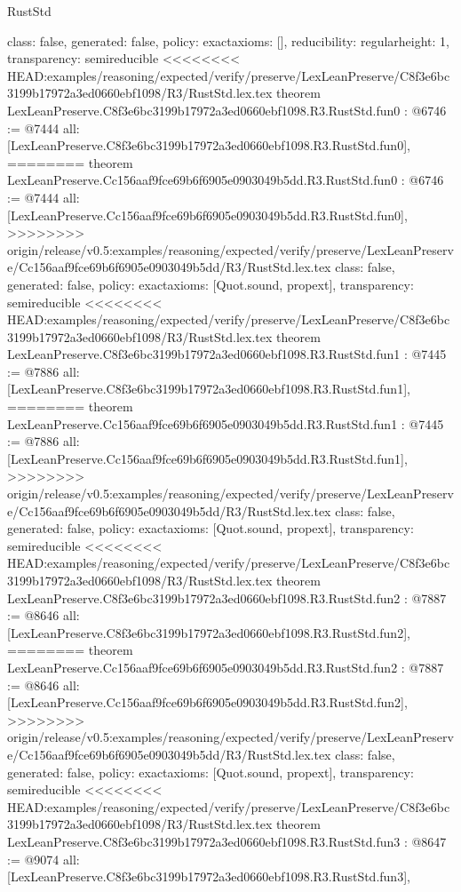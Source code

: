 \begin{lexlean}{RustStd}
\begin{coremodule}
{\begin{coremodule}
{{{  class: false,
  generated: false,
  policy: exact{axioms: []},
  reducibility: regular{height: 1},
  transparency: semireducible
}
<<<<<<<< HEAD:examples/reasoning/expected/verify/preserve/LexLeanPreserve/C8f3e6bc3199b17972a3ed0660ebf1098/R3/RustStd.lex.tex
theorem LexLeanPreserve.C8f3e6bc3199b17972a3ed0660ebf1098.R3.RustStd.fun0 : @6746 := @7444 {
  all: [LexLeanPreserve.C8f3e6bc3199b17972a3ed0660ebf1098.R3.RustStd.fun0],
========
theorem LexLeanPreserve.Cc156aaf9fce69b6f6905e0903049b5dd.R3.RustStd.fun0 : @6746 := @7444 {
  all: [LexLeanPreserve.Cc156aaf9fce69b6f6905e0903049b5dd.R3.RustStd.fun0],
>>>>>>>> origin/release/v0.5:examples/reasoning/expected/verify/preserve/LexLeanPreserve/Cc156aaf9fce69b6f6905e0903049b5dd/R3/RustStd.lex.tex
  class: false,
  generated: false,
  policy: exact{axioms: [Quot.sound, propext]},
  transparency: semireducible
}
<<<<<<<< HEAD:examples/reasoning/expected/verify/preserve/LexLeanPreserve/C8f3e6bc3199b17972a3ed0660ebf1098/R3/RustStd.lex.tex
theorem LexLeanPreserve.C8f3e6bc3199b17972a3ed0660ebf1098.R3.RustStd.fun1 : @7445 := @7886 {
  all: [LexLeanPreserve.C8f3e6bc3199b17972a3ed0660ebf1098.R3.RustStd.fun1],
========
theorem LexLeanPreserve.Cc156aaf9fce69b6f6905e0903049b5dd.R3.RustStd.fun1 : @7445 := @7886 {
  all: [LexLeanPreserve.Cc156aaf9fce69b6f6905e0903049b5dd.R3.RustStd.fun1],
>>>>>>>> origin/release/v0.5:examples/reasoning/expected/verify/preserve/LexLeanPreserve/Cc156aaf9fce69b6f6905e0903049b5dd/R3/RustStd.lex.tex
  class: false,
  generated: false,
  policy: exact{axioms: [Quot.sound, propext]},
  transparency: semireducible
}
<<<<<<<< HEAD:examples/reasoning/expected/verify/preserve/LexLeanPreserve/C8f3e6bc3199b17972a3ed0660ebf1098/R3/RustStd.lex.tex
theorem LexLeanPreserve.C8f3e6bc3199b17972a3ed0660ebf1098.R3.RustStd.fun2 : @7887 := @8646 {
  all: [LexLeanPreserve.C8f3e6bc3199b17972a3ed0660ebf1098.R3.RustStd.fun2],
========
theorem LexLeanPreserve.Cc156aaf9fce69b6f6905e0903049b5dd.R3.RustStd.fun2 : @7887 := @8646 {
  all: [LexLeanPreserve.Cc156aaf9fce69b6f6905e0903049b5dd.R3.RustStd.fun2],
>>>>>>>> origin/release/v0.5:examples/reasoning/expected/verify/preserve/LexLeanPreserve/Cc156aaf9fce69b6f6905e0903049b5dd/R3/RustStd.lex.tex
  class: false,
  generated: false,
  policy: exact{axioms: [Quot.sound, propext]},
  transparency: semireducible
}
<<<<<<<< HEAD:examples/reasoning/expected/verify/preserve/LexLeanPreserve/C8f3e6bc3199b17972a3ed0660ebf1098/R3/RustStd.lex.tex
theorem LexLeanPreserve.C8f3e6bc3199b17972a3ed0660ebf1098.R3.RustStd.fun3 : @8647 := @9074 {
  all: [LexLeanPreserve.C8f3e6bc3199b17972a3ed0660ebf1098.R3.RustStd.fun3],
}}}}}}
\end{coremodule}}
\end{coremodule}
\end{lexlean}
